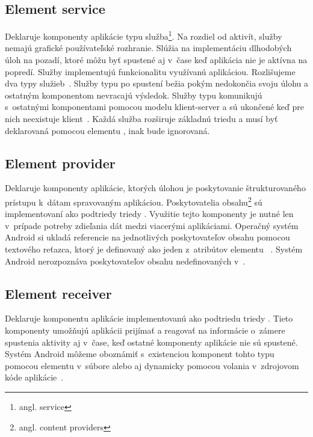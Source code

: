 \subsection{Element service}
Deklaruje komponenty aplikácie typu služba\footnote{angl. service}. Na rozdiel od aktivít, služby nemajú grafické používateľské rozhranie. Slúžia na implementáciu dlhodobých úloh na pozadí, ktoré môžu byť spustené aj v~čase keď aplikácia nie je aktívna na popredí. 
Služby implementujú funkcionalitu využívanú aplikáciou. Rozlišujeme dva typy služieb~\cite{elService}. Služby typu  po spustení bežia pokým nedokončia svoju úlohu a ostatným komponentom nevracajú výsledok. Služby typu  komunikujú s~ostatnými komponentami pomocou modelu klient-server a sú ukončené keď pre nich neexistuje klient~\cite{boundService}. Každá služba rozširuje základnú triedu  a musí byť deklarovaná pomocou elementu , inak bude ignorovaná.

\subsection{Element provider}
Deklaruje komponenty aplikácie, ktorých úlohou je poskytovanie štrukturovaného prístupu k~dátam spravovaným aplikáciou. Poskytovatelia obsahu\footnote{angl. content providers} sú implementovaní ako podtriedy triedy . Využitie tejto komponenty je nutné len v~prípade potreby zdieľania dát medzi viacerými aplikáciami. Operačný systém Android si ukladá referencie na jednotlivých poskytovateľov obsahu pomocou  textového reťazca, ktorý je definovaný ako jeden z~atribútov elementu ~\cite{elContentProvider}. Systém Android nerozpoznáva poskytovateľov obsahu nedefinovaných v~.

\subsection{Element receiver}
Deklaruje komponentu aplikácie implementovanú ako podtriedu triedy . Tieto komponenty umožňujú aplikácii prijímať a reagovať na informácie o~zámere spustenia aktivity aj v~čase, keď ostatné komponenty aplikácie nie sú spustené. Systém Android môžeme oboznámiť s~existenciou komponent tohto typu pomocou elementu  v~súbore  alebo aj dynamicky pomocou volania  v~zdrojovom kóde aplikácie~\cite{elReceiver}.

